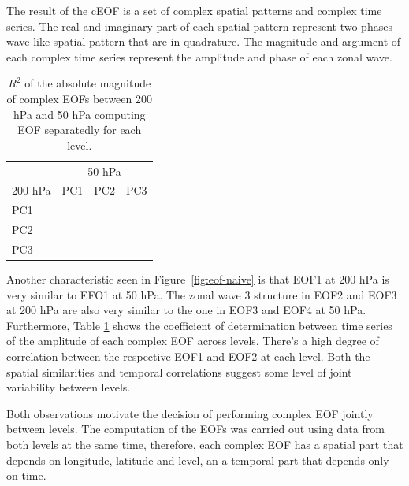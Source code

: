 \documentclass[smallextended]{svjour3}       %
\begin{document}
The result of the cEOF is a set of complex spatial patterns and complex time series. The real and imaginary part of each spatial pattern represent two phases wave-like spatial pattern that are in quadrature. The magnitude and argument of each complex time series represent the amplitude and phase of each zonal wave.

\begin{table}

\caption{\label{tab:corr-ceof-splitted}$R^2$ of the absolute magnitude of complex EOFs between 200 hPa and 50 hPa computing EOF separatedly for each level.}
\centering
\begin{tabular}[t]{l>{}r>{}r>{}r}
\toprule
\multicolumn{1}{c}{} & \multicolumn{3}{c}{50 hPa} \\
\cmidrule(l{3pt}r{3pt}){2-4}
200 hPa & PC1 & PC2 & PC3\\
\midrule
PC1 & \cellcolor[HTML]{E1C0BB}{\textcolor{black}{0.28}} & \cellcolor[HTML]{FDFAFA}{\textcolor{black}{0.02}} & \cellcolor[HTML]{FDFAFA}{\textcolor{black}{0.02}}\\
PC2 & \cellcolor[HTML]{FFFFFF}{\textcolor{black}{0.00}} & \cellcolor[HTML]{BB7A73}{\textcolor{white}{0.60}} & \cellcolor[HTML]{FDFAFA}{\textcolor{black}{0.02}}\\
PC3 & \cellcolor[HTML]{FFFFFF}{\textcolor{black}{0.00}} & \cellcolor[HTML]{FFFFFF}{\textcolor{black}{0.00}} & \cellcolor[HTML]{FDFCFC}{\textcolor{black}{0.01}}\\
\bottomrule
\end{tabular}
\end{table}

Another characteristic seen in Figure~\ref{fig:eof-naive} is that EOF1 at 200 hPa is very similar to EFO1 at 50 hPa. The zonal wave 3 structure in EOF2 and EOF3 at 200 hPa are also very similar to the one in EOF3 and EOF4 at 50 hPa. Furthermore, Table \ref{tab:corr-ceof-splitted} shows the coefficient of determination between time series of the amplitude of each complex EOF across levels. There's a high degree of correlation between the respective EOF1 and EOF2 at each level. Both the spatial similarities and temporal correlations suggest some level of joint variability between levels.

Both observations motivate the decision of performing complex EOF jointly between levels. The computation of the EOFs was carried out using data from both levels at the same time, therefore, each complex EOF has a spatial part that depends on longitude, latitude and level, an a temporal part that depends only on time.
\end{document}
